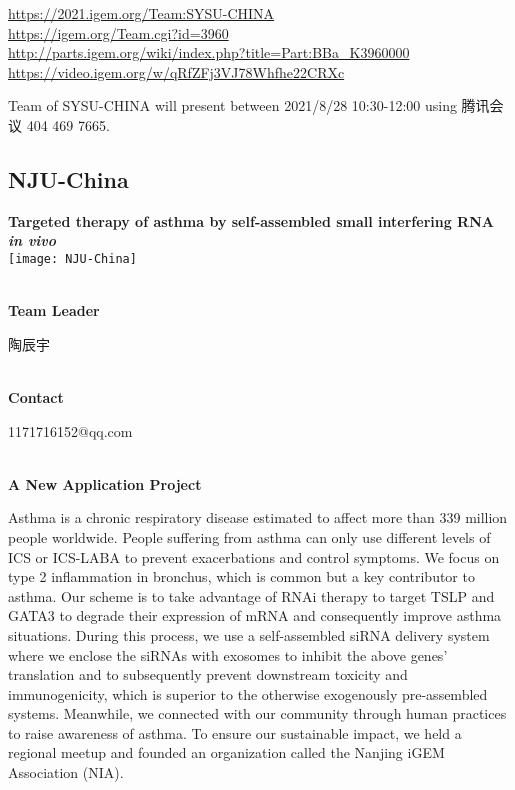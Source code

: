 \url{https://2021.igem.org/Team:SYSU-CHINA }\\
\url{https://igem.org/Team.cgi?id=3960 }\\
\url{http://parts.igem.org/wiki/index.php?title=Part:BBa_K3960000 }\\
\url{https://video.igem.org/w/qRfZFj3VJ78Whfhe22CRXc }\\

\vfill{}









Team of SYSU-CHINA will present between     2021/8/28 10:30-12:00    using 腾讯会议 404 469 7665.
\newpage


\subsection{\textcolor{Blu}{ NJU-China } }
\vspace{5mm}
\begin{center}
\large{
  \textbf{ Targeted therapy of asthma by self-assembled small interfering RNA \textit{in vivo} }\\

  \texttt{[image: NJU-China]}
}
\end{center}
\textbf{\\Team Leader}

  陶辰宇


\textbf{\\Contact}

  1171716152@qq.com


\textbf{\\A New Application Project\\}\begin{spacing}{1.5}

Asthma is a chronic respiratory disease estimated to affect more than 339 million people worldwide. People suffering from asthma can only use different levels of ICS or ICS-LABA to prevent exacerbations and control symptoms. We focus on type 2 inflammation in bronchus, which is common but a key contributor to asthma. Our scheme is to take advantage of RNAi therapy to target TSLP and GATA3 to degrade their expression of mRNA and consequently improve asthma situations. During this process, we use a self-assembled siRNA delivery system where we enclose the siRNAs with exosomes to inhibit the above genes’ translation and to subsequently prevent downstream toxicity and immunogenicity, which is superior to the otherwise exogenously pre-assembled systems. Meanwhile, we connected with our community through human practices to raise awareness of asthma. To ensure our sustainable impact, we held a regional meetup and founded an organization called the Nanjing iGEM Association (NIA).\end{spacing}
\\

